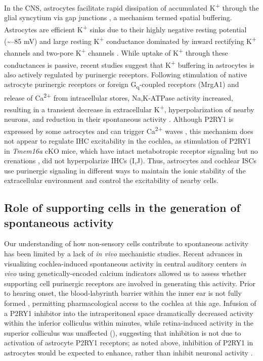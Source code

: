 \documentclass[9pt,lineno]{elife}
\begin{document}
In the CNS, astrocytes facilitate rapid dissipation of accumulated K\textsuperscript{+} through the glial syncytium via gap junctions \citep{Kofuji2004}, a mechanism termed spatial buffering. Astrocytes are efficient K\textsuperscript{+} sinks due to their highly negative resting potential (\textasciitilde --85 mV) and large resting K\textsuperscript{+} conductance dominated by inward rectifying K\textsuperscript{+} channels and two-pore K\textsuperscript{+} channels \citep{Ryoo2016,Olsen2012}. While uptake of K\textsuperscript{+} through these conductances is passive, recent studies suggest that K\textsuperscript{+} buffering in astrocytes is also actively regulated by purinergic receptors. Following stimulation of native astrocyte purinergic receptors or foreign G\textsubscript{q}-coupled receptors (MrgA1) and release of Ca\textsuperscript{2+} from intracellular stores, Na,K-ATPase activity increased, resulting in a transient decrease in extracellular K\textsuperscript{+}, hyperpolarization of nearby neurons, and reduction in their spontaneous activity \citep{Wang2012}. Although P2RY1 is expressed by some astrocytes and can trigger Ca\textsuperscript{2+} waves \citep{Gallagher2003}, this mechanism does not appear to regulate IHC excitability in the cochlea, as stimulation of P2RY1 in \textit{Tmem16a} cKO mice, which have intact metabotropic receptor signaling but no crenations \citep{Wang2015}, did not hyperpolarize IHCs (I,J). Thus, astrocytes and cochlear ISCs use purinergic signaling in different ways to maintain the ionic stability of the extracellular environment and control the excitability of nearby cells.

\subsection{Role of supporting cells in the generation of spontaneous activity}
Our understanding of how non-sensory cells contribute to spontaneous activity has been limited by a lack of \textit{in vivo} mechanistic studies. Recent advances in visualizing cochlea-induced spontaneous activity in central auditory centers \textit{in vivo} using genetically-encoded calcium indicators \citep{Babola2018} allowed us to assess whether supporting cell purinergic receptors are involved in generating this activity. Prior to hearing onset, the blood-labyrinth barrier within the inner ear is not fully formed \citep{Suzuki1998}, permitting pharmacological access to the cochlea at this age. Infusion of a P2RY1 inhibitor into the intraperitoneal space dramatically decreased activity within the inferior colliculus within minutes, while retina-induced activity in the superior colliculus \citep{Ackman2012} was unaffected (), suggesting that inhibition is not due to activation of astrocyte P2RY1 receptors; as noted above, inhibition of P2RY1 in astrocytes would be expected to enhance, rather than inhibit neuronal activity \citep{Wang2012}. 
\end{document}
